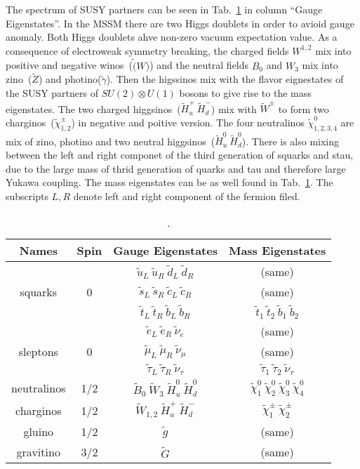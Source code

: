 The spectrum of SUSY partners can be seen in Tab.~\ref{tab:SUSYspectrum} in column ``Gauge Eigenstates''. In the MSSM there are two Higgs doublets in order  to avioid gauge anomaly. Both Higgs doublets ahve non-zero vacuum expectation value. As a consequence of electroweak symmetry breaking, the charged fields $W^{1,2}$ mix into positive and negative winos~($\tilde(W)$) and the neutral fields $B_{0}$ and $W_{3}$ mix into zino~($\tilde{Z}$) and photino($\tilde{\gamma}$). Then the higssinos mix with the flavor eignestates of the SUSY partners of $SU(2) \otimes U(1)$ bosons to give rise to the mass eigenstates. The two charged higgsinos~($\tilde{H}_{u}^{+}~\tilde{H}_{d}^{-}$) mix with $\tilde{W}^{\pm}$ to form two charginos~($\tilde{\chi}_{1,2}^{\pm}$) in negative and poitive version. The four neutralinos $\tilde{\chi}_{1,2,3,4}^{0}$ are mix of zino, photino and two neutral higgsinos~($\tilde{H}_{u}^{0}~\tilde{H}_{d}^{0}$). There is also mixing between the left and right componet of the third generation of squarks and stau, due to the large mass of thrid generation of quarks and tau and therefore large Yukawa coupling. The mass eigenstates can be as well found in Tab.~\ref{tab:SUSYspectrum}. The subscripts $L,R$ denote left and right component of the  fermion filed.

\begin{table}[h]
\begin{center}
\begin{tabular}{|c|c|c|c|}
\hline
Names & Spin  & Gauge Eigenstates & Mass Eigenstates  \\
\hline
        &   & $\tilde{u}_{L}~\tilde{u}_{R}~\tilde{d}_{L}~\tilde{d}_{R}$  & (same) \\
squarks & 0 & $\tilde{s}_{L}~\tilde{s}_{R}~\tilde{c}_{L}~\tilde{c}_{R}$  & (same) \\
        &   & $\tilde{t}_{L}~\tilde{t}_{R}~\tilde{b}_{L}~\tilde{b}_{R}$  & $\tilde{t}_{1}~\tilde{t}_{2}~\tilde{b}_{1}~\tilde{b}_{2}$ \\
\hline
         &   & $\tilde{e}_{L}~\tilde{e}_{R}~\tilde{\nu}_{e}$  & (same) \\
sleptons & 0 & $\tilde{\mu}_{L}~\tilde{\mu}_{R}~\tilde{\nu}_{\mu}$  & (same) \\
         &   & $\tilde{\tau}_{L}~\tilde{\tau}_{R}~\tilde{\nu}_{\tau}$  & $\tilde{\tau}_{1}~\tilde{\tau}_{2}~\tilde{\nu}_{\tau}$ \\
\hline
neutralinos & 1/2 & $\tilde{B}_{0}~\tilde{W}_{3}~\tilde{H}_{u}^{0}~\tilde{H}_{d}^{0}$  & $\tilde{\chi}_{1}^{0}~\tilde{\chi}_{2}^{0}~\tilde{\chi}_{3}^{0}~\tilde{\chi}_{4}^{0} $ \\
\hline
charginos & 1/2 & $\tilde{W}_{1,2}~\tilde{H}_{u}^{+}~\tilde{H}_{d}^{-}$  & $\tilde{\chi}_{1}^{\pm}~\tilde{\chi}_{2}^{\pm} $ \\
\hline
gluino & 1/2 & $\tilde{g}$  & (same) \\
\hline
gravitino & 3/2 & $\tilde{G}$  & (same) \\
\hline
\end{tabular}
\caption[Table caption text]{\cite{Martin:1997ns}. }
\label{tab:SUSYspectrum}
\end{center}
\end{table}

